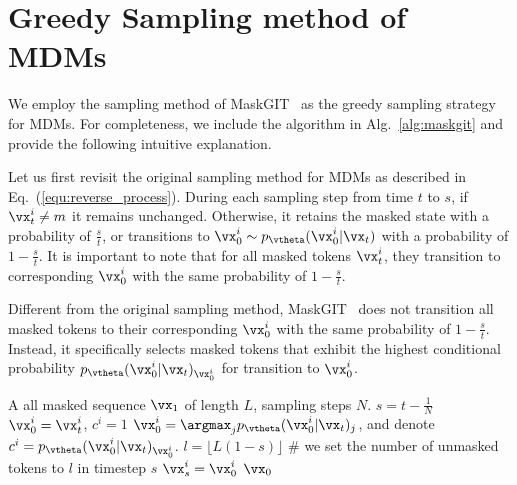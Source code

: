 \documentclass{article} %
\begin{document}



\newpage 
\appendix
\section{Greedy Sampling method of MDMs}
\label{app:greddy_sample}
We employ the sampling method of MaskGIT~\citep{chang2022maskgit} as the greedy sampling strategy for MDMs. For completeness, we include the algorithm in Alg.~\ref{alg:maskgit} and provide the following intuitive explanation.

Let us first revisit the original sampling method for MDMs as described in Eq.~(\ref{equ:reverse_process}). During each sampling step from time $t$ to $s$, if $\vx_t^i \neq m$ it remains unchanged. Otherwise, it retains the masked state with a probability of $\frac{s}{t}$, or transitions to $\vx_0^i \sim p_{\vtheta}(\vx_0^i|\vx_t)$ with a probability of $1 - \frac{s}{t}$. It is important to note that for all masked tokens $\vx_t^i$, they transition to corresponding $\vx_0^i$ with the same probability of $1 - \frac{s}{t}$.

Different from the original sampling method, MaskGIT~\citep{chang2022maskgit} does not transition all masked tokens to their corresponding $\vx_0^i$ with the same probability of $1 - \frac{s}{t}$. Instead, it specifically selects masked tokens that exhibit the highest conditional probability $p_{\vtheta}(\vx_0^i|\vx_t)_{\vx_0^i}$ for transition to $\vx_0^i$.

\begin{algorithm}[t!]
  \caption{Greedy sampling method of MDMs}
  \label{alg:maskgit}
  \begin{algorithmic}[1]
    \REQUIRE A all masked sequence $\vx_1$ of length $L$, sampling steps $N$.
    \STATE $s = t - \frac{1}{N}$
                \STATE $\vx_0^i=\vx_t^i$, $c^i=1$
            \ELSE
                \STATE $\vx_0^i = \argmax_j p_{\vtheta}(\vx_0^i|\vx_t)_j$, and denote $c^i = p_{\vtheta}(\vx_0
                ^i|\vx_t)_{\vx_0^i}$.
            \ENDIF
        \ENDFOR
    \STATE  $l=\lfloor L (1 - s) \rfloor$ \hfill \# we set the number of unmasked tokens to $l$ in timestep $s$
                \STATE $\vx_s^i = \vx_0^i$
            \ENDIF
        \ENDFOR
    \ENDFOR
    \RETURN $\vx_0$
  \end{algorithmic}
\end{algorithm}
\end{document}
